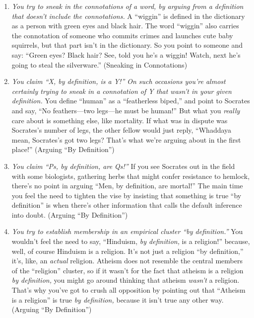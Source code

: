 {\begin{enumerate}
\item {
 \textit{You try to sneak in the connotations of a word, by arguing
from a definition that doesn't include the
connotations.} A ``wiggin'' is
defined in the dictionary as a person with green eyes and black hair.
The word ``wiggin'' also carries the
connotation of someone who commits crimes and launches cute baby
squirrels, but that part isn't in the dictionary. So
you point to someone and say: ``Green eyes? Black
hair? See, told you he's a wiggin! Watch, next
he's going to steal the silverware.''
(Sneaking in Connotations)}

\item {
 \textit{You claim ``X, by definition, is a
Y!'' On such occasions you're almost
certainly trying to sneak in a connotation of Y that
wasn't in your given definition.} You define
``human'' as a
``featherless biped,'' and point to
Socrates and say, ``No feathers---two legs---he must
be human!'' But what you \textit{really} care about
is something else, like mortality. If what was in dispute was
Socrates's number of legs, the other fellow would just
reply, ``Whaddaya mean, Socrates's got
two legs? That's what we're arguing
about in the first place!'' (Arguing
``By Definition'')}

\item {
 \textit{You claim ``Ps, by definition, are
Qs!''} If you see Socrates out in the field with some
biologists, gathering herbs that might confer resistance to hemlock,
there's no point in arguing ``Men, by
definition, are mortal!'' The main time you feel the
need to tighten the vise by insisting that something is true
``by definition'' is when
there's other information that calls the default
inference into doubt. (Arguing ``By
Definition'')}

\item {
 \textit{You try to establish membership in an empirical cluster
``by definition.''} You
wouldn't feel the need to say,
``Hinduism, \textit{by definition,} is a
religion!'' because, well, of course Hinduism is a
religion. It's not just a religion
``by definition,''
it's, like, an \textit{actual} religion. Atheism does
not resemble the central members of the
``religion'' cluster, so if it
wasn't for the fact that atheism is a religion
\textit{by definition,} you might go around thinking that atheism
\textit{wasn't} a religion. That's why
you've got to crush all opposition by pointing out that
``Atheism is a religion'' is true
\textit{by definition,} because it isn't true any other
way. (Arguing ``By Definition'')}


\end{enumerate}}
